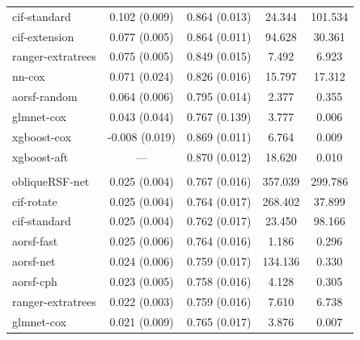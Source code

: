 \documentclass[twoside,11pt]{article}\usepackage[]{graphicx}\usepackage[]{xcolor}
\newenvironment{knitrout}{}{} %
\begin{document}
\begin{knitrout}
\begin{longtable}[t]{lcccc}
\hspace{1em}cif-standard & 0.102 (0.009) & 0.864 (0.013) & 24.344 & 101.534\\
\hspace{1em}cif-extension & 0.077 (0.005) & 0.864 (0.011) & 94.628 & 30.361\\
\hspace{1em}ranger-extratrees & 0.075 (0.005) & 0.849 (0.015) & 7.492 & 6.923\\
\hspace{1em}nn-cox & 0.071 (0.024) & 0.826 (0.016) & 15.797 & 17.312\\
\hspace{1em}aorsf-random & 0.064 (0.006) & 0.795 (0.014) & 2.377 & 0.355\\
\hspace{1em}glmnet-cox & 0.043 (0.044) & 0.767 (0.139) & 3.777 & 0.006\\
\hspace{1em}xgboost-cox & -0.008 (0.019) & 0.869 (0.011) & 6.764 & 0.009\\
\hspace{1em}xgboost-aft & --- & 0.870 (0.012) & 18.620 & 0.010\\
\addlinespace[0.3em]
\multicolumn{5}{l}{\textit{\textbf{MESA; stroke, n = 6783, p = 48}}}\\
\hline
\hspace{1em}obliqueRSF-net & 0.025 (0.004) & 0.767 (0.016) & 357.039 & 299.786\\
\hspace{1em}cif-rotate & 0.025 (0.004) & 0.764 (0.017) & 268.402 & 37.899\\
\hspace{1em}cif-standard & 0.025 (0.004) & 0.762 (0.017) & 23.450 & 98.166\\
\hspace{1em}aorsf-fast & 0.025 (0.006) & 0.764 (0.016) & 1.186 & 0.296\\
\hspace{1em}aorsf-net & 0.024 (0.006) & 0.759 (0.017) & 134.136 & 0.330\\
\hspace{1em}aorsf-cph & 0.023 (0.005) & 0.758 (0.016) & 4.128 & 0.305\\
\hspace{1em}ranger-extratrees & 0.022 (0.003) & 0.759 (0.016) & 7.610 & 6.738\\
\hspace{1em}glmnet-cox & 0.021 (0.009) & 0.765 (0.017) & 3.876 & 0.007\\

\end{longtable}
\end{knitrout}
\end{document}
